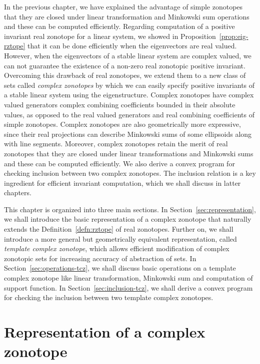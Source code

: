 
In the previous chapter, we have explained the advantage of simple
zonotopes that they are closed under linear transformation and
Minkowski sum operations and these can be computed efficiently.
Regarding computation of a positive invariant real zonotope for a
linear system, we showed in Proposition~\ref{prop:eig-rztope} that it
can be done efficiently when the eigenvectors are real valued.
However, when the eigenvectors of a stable linear system are complex
valued, we can not guarantee the existence of a non-zero real
zonotopic positive invariant.  Overcoming this drawback of real
zonotopes, we extend them to a new class of sets called \emph{complex
zonotopes} by which we can easily specify positive invariants of a
stable linear system using the eigenstructure.  Complex zonotopes have
complex valued generators complex combining coefficients bounded in
their absolute values, as opposed to the real valued generators and
real combining coefficients of simple zonotopes.  Complex zonotopes
are also geometrically more expressive, since their real projections
can describe Minkowski sums of some ellipsoids along with line
segments.  Moreover, complex zonotopes retain the merit of real
zonotopes that they are closed under linear transformations and
Minkowski sums and these can be computed efficiently.  We also derive
a convex program for checking inclusion between two complex zonotopes.
The inclusion relation is a key ingredient for efficient invariant
computation, which we shall discuss in latter chapters.

This chapter is organized into three main sections.  In
Section~\ref{sec:representation}, we shall introduce the basic
representation of a complex zonotope that naturally extends the
Definition~\ref{defn:rztope} of real zonotopes.  Further on, we shall
introduce a more general but geometrically equivalent representation,
called \emph{template complex zonotope}, which allows efficient
modification of complex zonotopic sets for increasing accuracy of
abstraction of sets.  In Section~\ref{sec:operations-tcz}, we shall
discuss basic operations on a template complex zonotope like linear
transformation, Minkowski sum and computation of support function.  In
Section~\ref{sec:inclusion-tcz}, we shall derive a convex program for
checking the inclusion between two template complex zonotopes.  

\section{Representation of a complex zonotope}~\label{sec:representation}



